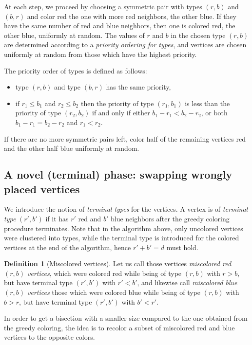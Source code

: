 \documentclass{article}
\theoremstyle{definition}
\newtheorem{defi}[definition]{Definition}
\begin{document}
At each step, we proceed by choosing a symmetric pair with types $(r,b)$ and  $(b,r)$ and color red the one with more red neighbors, the other blue. If they have the same number of red and blue neighbors, then one is colored red, the other blue, uniformly at random.
The values of $r$ and $b$ in the chosen type $(r,b)$ are determined according to a \textit{priority ordering for types}, and vertices are chosen uniformly at random from those which have the highest priority.

The priority order of types is defined as follows:
\begin{itemize}
\item type $(r,b)$ and type $(b,r)$ has the same priority,
\item if $r_1\leq b_1$ and $r_2\leq b_2$ then the priority of type $(r_1,b_1)$ is less than the priority of type $(r_2,b_2)$ if and only if either $b_1-r_1<b_2-r_2$, or both $b_1-r_1=b_2-r_2$ and $r_1<r_2$.
\end{itemize}

If there are no more symmetric pairs left, color half of the remaining vertices red and the other half blue uniformly at random. 

\subsection{A novel (terminal) phase: swapping wrongly placed vertices}\label{sec:novelphase}

 We introduce the notion of \textit{terminal types} for the vertices. A vertex is of {\em terminal type} $(r',b')$ if it has $r'$ red and $b'$ blue neighbors after the greedy coloring procedure terminates.
 Note that in the algorithm above, only uncolored vertices were clustered into types, while the terminal type is introduced for the colored vertices at the end of the algorithm, hence $r'+b'=d$ must hold.
\begin{defi}[Miscolored vertices]	Let us call those vertices {\em miscolored red $(r,b)$ vertices}, which were colored red while being of type $(r,b)$ with $r> b$, but have terminal type $(r',b')$ with $r'<b'$,  and likewise call {\em miscolored blue $(r,b)$ vertices} those which were colored blue while being of type $(r,b)$ with $b> r$, but have terminal type $(r', b')$ with $b'<r'$. 
\end{defi}

 In order to get a bisection with a smaller size compared to the one obtained from the greedy coloring, the idea is to recolor a subset of miscolored red and blue vertices to the opposite colors.
\end{document}

